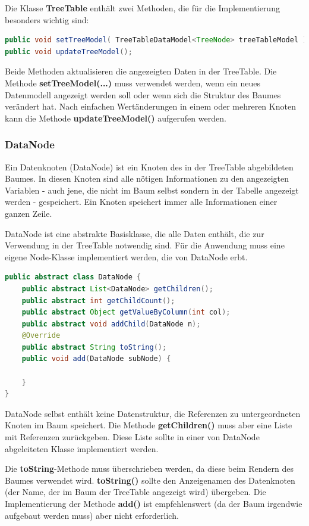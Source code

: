Die Klasse \textbf{TreeTable} enthält zwei Methoden, die für die Implementierung besonders wichtig sind:
\begin{lstlisting}[language=JAVA]
public void setTreeModel( TreeTableDataModel<TreeNode> treeTableModel );
public void updateTreeModel();
\end{lstlisting}

Beide Methoden aktualisieren die angezeigten Daten in der TreeTable. Die Methode \textbf{setTreeModel(...)} muss verwendet werden, wenn ein neues Datenmodell angezeigt werden soll oder wenn sich die Struktur des Baumes verändert hat. Nach einfachen Wertänderungen in einem oder mehreren Knoten kann die Methode \textbf{updateTreeModel()} aufgerufen werden.

\subsubsection*{DataNode}
Ein Datenknoten (DataNode) ist ein Knoten des in der TreeTable abgebildeten Baumes. In diesen Knoten sind alle nötigen Informationen zu den angezeigten Variablen - auch jene, die nicht im Baum selbst sondern in der Tabelle angezeigt werden - gespeichert. Ein Knoten speichert immer alle Informationen einer ganzen Zeile.

DataNode ist eine abstrakte Basisklasse, die alle Daten enthält, die zur Verwendung in der TreeTable notwendig sind. Für die Anwendung muss eine eigene Node-Klasse implementiert werden, die von DataNode erbt.

\begin{lstlisting}[language=JAVA]
public abstract class DataNode {
	public abstract List<DataNode> getChildren();
	public abstract int getChildCount();
	public abstract Object getValueByColumn(int col);
	public abstract void addChild(DataNode n);
	@Override
	public abstract String toString();
	public void add(DataNode subNode) {
	
	}
}
\end{lstlisting}

DataNode selbst enthält keine Datenstruktur, die Referenzen zu untergeordneten Knoten im Baum speichert. Die Methode \textbf{getChildren()} muss aber eine Liste mit Referenzen zurückgeben. Diese Liste sollte in einer von DataNode abgeleiteten Klasse implementiert werden.

Die \textbf{toString}-Methode muss überschrieben werden, da diese beim Rendern des Baumes verwendet wird. \textbf{toString()} sollte den Anzeigenamen des Datenknoten (der Name, der im Baum der TreeTable angezeigt wird) übergeben. Die Implementierung der Methode \textbf{add()} ist empfehlenswert (da der Baum irgendwie aufgebaut werden muss) aber nicht erforderlich.

